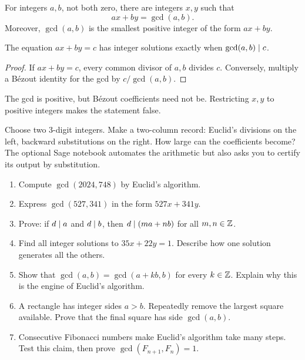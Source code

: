 \begin{theorem}
For integers $a,b$, not both zero, there are integers $x,y$ such that
\[
ax+by=\gcd(a,b).
\]
Moreover, $\gcd(a,b)$ is the smallest positive integer of the form $ax+by$.
\end{theorem}

\begin{corollary}
The equation $ax+by=c$ has integer solutions exactly when $\gcd(a,b)\mid c$.
\end{corollary}

\begin{proof}
If $ax+by=c$, every common divisor of $a,b$ divides $c$. Conversely, multiply a B\'ezout identity for the gcd by $c/\gcd(a,b)$.
\end{proof}

\begin{warningbox}
The gcd is positive, but B\'ezout coefficients need not be. Restricting $x,y$ to positive integers makes the statement false.
\end{warningbox}

\begin{labbox}
Choose two 3-digit integers. Make a two-column record: Euclid's divisions on the left, backward substitutions on the right. How large can the coefficients become? The optional Sage notebook automates the arithmetic but also asks you to certify its output by substitution.
\end{labbox}

\begin{exercisebox}
\begin{enumerate}
  \item Compute $\gcd(2024,748)$ by Euclid's algorithm. 
  \item Express $\gcd(527,341)$ in the form $527x+341y$. 
  \item Prove: if $d\mid a$ and $d\mid b$, then $d\mid (ma+nb)$ for all $m,n\in\mathbb Z$. 
  \item Find all integer solutions to $35x+22y=1$. Describe how one solution generates all the others. 
  \item Show that $\gcd(a,b)=\gcd(a+kb,b)$ for every $k\in\mathbb Z$. Explain why this is the engine of Euclid's algorithm. 
  \item A rectangle has integer sides $a>b$. Repeatedly remove the largest square available. Prove that the final square has side $\gcd(a,b)$. 
  \item Consecutive Fibonacci numbers make Euclid's algorithm take many steps. Test this claim, then prove $\gcd(F_{n+1},F_n)=1$. 
\end{enumerate}
\end{exercisebox}

